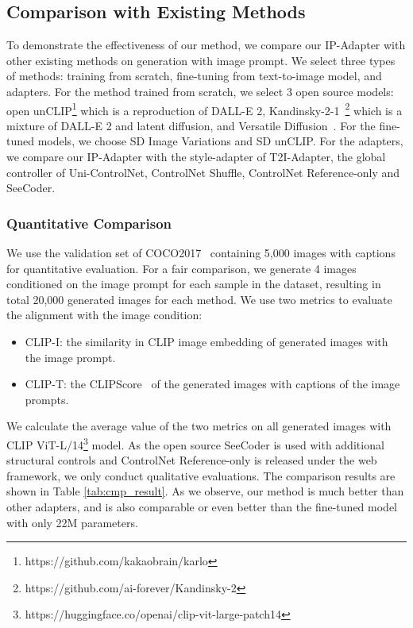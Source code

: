 \documentclass{article}
\begin{document}
\subsection{Comparison with Existing Methods}
To demonstrate the effectiveness of our method, we compare our IP-Adapter with other existing methods on generation with image prompt. We select three types of methods: training from scratch, fine-tuning from text-to-image model, and adapters. For the method trained from scratch, we select 3 open source models: open unCLIP\footnote{https://github.com/kakaobrain/karlo} which is a reproduction of DALL-E 2, Kandinsky-2-1~\footnote{https://github.com/ai-forever/Kandinsky-2} which is a mixture of DALL-E 2 and latent diffusion, and Versatile Diffusion~\cite{xu2022versatile}. For the fine-tuned models, we choose SD Image Variations and SD unCLIP. For the adapters, we compare our IP-Adapter with the style-adapter of T2I-Adapter, the global controller of Uni-ControlNet, ControlNet Shuffle, ControlNet Reference-only and SeeCoder.

\subsubsection{Quantitative Comparison}
We use the validation set of COCO2017~\cite{lin2014microsoft} containing 5,000 images with captions for quantitative evaluation. For a fair comparison, we generate 4 images conditioned on the image prompt for each sample in the dataset, resulting in total 20,000 generated images for each method. We use two metrics to evaluate the alignment with the image condition: 
\begin{itemize}
\item CLIP-I: the similarity in CLIP image embedding of generated images with
the image prompt.
\item CLIP-T: the CLIPScore~\cite{hessel2021clipscore} of the generated images with
captions of the image prompts.
\end{itemize}
We calculate the average value of the two metrics on all generated images with CLIP ViT-L/14\footnote{https://huggingface.co/openai/clip-vit-large-patch14} model. As the open source SeeCoder is used with additional structural controls and ControlNet Reference-only is released under the web framework, we only conduct qualitative evaluations. The comparison results are shown in Table \ref{tab:cmp_result}. As we observe, our method is much better than other adapters, and is also comparable or even better than the fine-tuned model with only 22M parameters.
\end{document}

